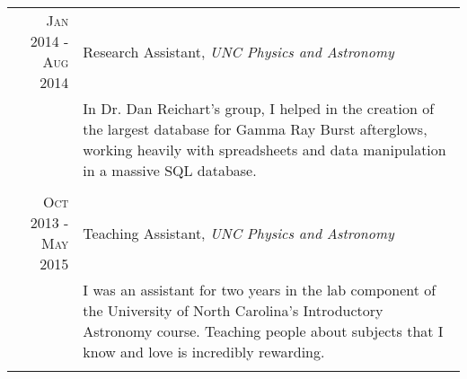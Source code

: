 \documentclass[a4paper,10pt]{article} %
\begin{document}
\begin{tabular}{r|p{11cm}}

\textsc{Jan 2014 - Aug 2014} & Research Assistant, \emph{UNC Physics and Astronomy} \\ 
& \footnotesize{In Dr. Dan Reichart's group, I helped in the creation of the largest database for Gamma Ray Burst afterglows, working heavily with spreadsheets and data manipulation in a massive SQL database.}\\
\multicolumn{2}{c}{} \\


\textsc{Oct 2013 - May 2015} & Teaching Assistant, \emph{UNC Physics and Astronomy} \\
& \footnotesize{I was an assistant for two years in the lab component of the University of North Carolina's Introductory Astronomy course. Teaching people about subjects that I know and love is incredibly rewarding.}\\
\multicolumn{2}{c}{} \\



\end{tabular}
\end{document}
